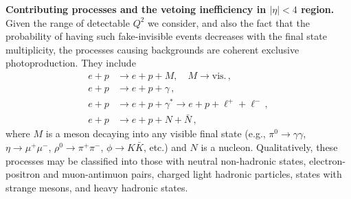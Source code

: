 \documentclass[aps,prd,preprintnumbers,superscriptaddress,nofootinbib,floatfix,twocolumn,notitlepage,reprint]{revtex4-2}
\begin{document}
\textbf{Contributing processes and the vetoing inefficiency in $|\eta|<4$ region.} 
Given the range of detectable $Q^{2}$ we consider, and also the fact that the probability of having such fake-invisible events decreases with the final state multiplicity, the processes causing backgrounds are coherent exclusive photoproduction. They include
%
\begin{align}
    \label{eq:quasi-el-1}
    e + p &\to e + p + M, \quad M \to \text{vis.}\,, \\ 
    \label{eq:quasi-el-0}
    e + p &\to e + p + \gamma\,, \\
    \label{eq:quasi-el-pair}
    e + p &\to e + p + \gamma^{*} \to e + p + \ell^{+} + \ell^{-}\,, \\
    \label{eq:quasi-el-di-nucleon}
    e + p &\to e + p + N + \bar{N}\,,  
\end{align}
%
where $M$ is a meson decaying into any visible final state (e.g., $\pi^{0}\to \gamma\gamma$, $\eta \to \mu^{+}\mu^{-}$, $\rho^{0}\to \pi^{+}\pi^{-}$, $\phi \to K\bar{K}$, etc.) and $N$ is a nucleon. 
Qualitatively, these processes may be classified into those with neutral non-hadronic states, electron-positron and muon-antimuon pairs, charged light hadronic particles, states with strange mesons, and heavy hadronic states.
\end{document}
